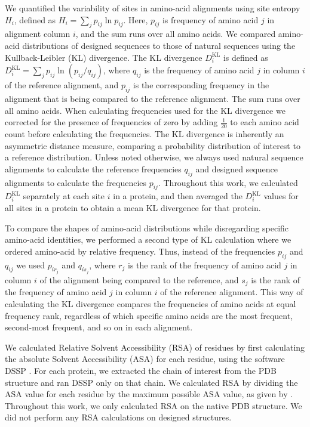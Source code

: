 \documentclass[12pt]{article}
\begin{document}
We quantified the variability of sites in amino-acid alignments using site entropy $H_i$, defined as $H_i=\sum_{j}p_{ij}\ln p_{ij}$. Here, $p_{ij}$ is frequency of amino acid $j$ in alignment column $i$, and the sum runs over all amino acids. We compared amino-acid distributions of designed sequences to those of natural sequences using the Kullback-Leibler (KL) divergence. The KL divergence $D^\text{KL}_i$ is defined as $D^\text{KL}_i= \sum_j  p_{ij} \ln  (p_{ij}/q_{ij})$, where $q_{ij}$ is the frequency of amino acid $j$ in column $i$ of the reference alignment, and $p_{ij}$ is the corresponding frequency in the alignment that is being compared to the reference alignment. The sum runs over all amino acids.  When calculating frequencies used for the KL divergence we corrected for the presence of frequencies of zero by adding  $\frac{1}{20}$ to each amino acid count before calculating the frequencies. The KL divergence is inherently an asymmetric distance measure, comparing a probability distribution of interest to a reference distribution. Unless noted otherwise, we always used natural sequence alignments to calculate the reference frequencies $q_{ij}$ and designed sequence alignments to calculate the frequencies $p_{ij}$. Throughout this work, we calculated $D^\text{KL}_i$ separately at each site $i$ in a protein, and then averaged the $D^\text{KL}_i$ values for all sites in a protein to obtain a mean KL divergence for that protein.

To compare the shapes of amino-acid distributions while disregarding specific amino-acid identities, we performed a second type of KL calculation where we ordered amino-acid by relative frequency. Thus, instead of the frequencies $p_{ij}$ and $q_{ij}$ we used $p_{ir_j}$ and $q_{is_j}$, where $r_j$ is the rank of the frequency of amino acid $j$ in column $i$ of the alignment being compared to the reference, and $s_j$ is the rank of the frequency of amino acid $j$ in column $i$ of the reference alignment. This way of calculating the KL divergence compares the frequencies of amino acids at equal frequency rank, regardless of which specific amino acids are the most frequent, second-most frequent, and so on in each alignment.

We calculated Relative Solvent Accessibility (RSA) of residues by first calculating the absolute Solvent Accessibility (ASA) for each residue, using the software DSSP \citep{Kabsch1983}. For each protein, we extracted the chain of interest from the PDB structure and ran DSSP only on that chain. We calculated RSA by dividing the ASA value for each residue by the maximum possible ASA value, as given by \citet{Tien}. Throughout this work, we only calculated RSA on the native PDB structure. We did not perform any RSA calculations on designed structures.
\end{document}
